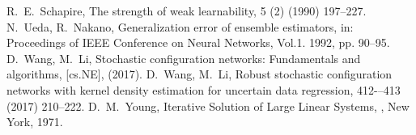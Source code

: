 \documentclass{article}
\begin{document}
\begin{thebibliography}{}
R.~E.~Schapire,
\newblock The strength of weak learnability,
 5 (2) (1990) 197--227.
N.~Ueda, R.~Nakano,
\newblock Generalization error of ensemble estimators,
\newblock in: Proceedings of IEEE Conference on Neural Networks, Vol.1. 1992, pp. 90--95.
D.~Wang, M.~Li,
\newblock Stochastic configuration networks: Fundamentals and algorithms,
 [cs.NE], (2017).
D.~Wang, M.~Li,
\newblock Robust stochastic configuration networks with kernel density estimation for uncertain data regression,
 412-–413 (2017) 210--222.
D.~M.~Young,
\newblock Iterative Solution of Large Linear Systems,
, New York, 1971. 

\end{thebibliography}
\end{document}
